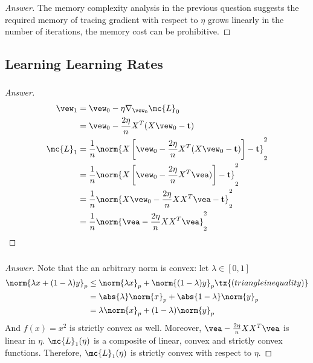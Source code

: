 \documentclass{article}
\begin{document}
	\subsubsection{}
	\begin{proof}[Answer]
		The memory complexity analysis in the previous question suggests the required memory of tracing gradient with respect to $\eta$ grows linearly in the number of iterations, the memory cost can be prohibitive.
	\end{proof}

	\subsection{Learning Learning Rates}
	\subsubsection{}
	\begin{proof}[Answer]
		\begin{align}
			\vew_1
			&= \vew_0 - \eta \nabla_{\vew_0} \mc{L}_0 \\
			&= \vew_0 - \frac{2 \eta}{n} X^T (X \vew_0 - \textbf{t}) \\
			\mc{L}_1
			&= \frac{1}{n} \norm{
				X \left [\vew_0 - \frac{2 \eta}{n} X^T (X \vew_0 - \textbf{t}) \right] - \textbf{t}
			}^2_2 \\
			&= \frac{1}{n} \norm{
				X \left [\vew_0 - \frac{2 \eta}{n} X^T \vea) \right] - \textbf{t}
			}^2_2 \\
			&= \frac{1}{n} \norm{
				X \vew_0 - \frac{2 \eta}{n} X X^T \vea - \textbf{t}
			}^2_2 \\
			&= \frac{1}{n} \norm{
				\vea - \frac{2 \eta}{n} X X^T \vea
			}^2_2
		\end{align}
	\end{proof}

	\subsubsection{}
	\begin{proof}[Answer]
		Note that the an arbitrary norm is convex: let $\lambda \in [0, 1]$
		\begin{align}
			\norm{\lambda x + (1 - \lambda) y}_p
			&\leq \norm{\lambda x}_p + \norm{(1 - \lambda) y}_p \tx{ (triangle inequality)} \\
			&= \abs{\lambda} \norm{x}_p + \abs{1 - \lambda} \norm{y}_p \\
			&= \lambda \norm{x}_p + (1 - \lambda) \norm{y}_p
		\end{align}
		And $f(x) = x^2$ is strictly convex as well.
		Moreover, $\vea - \frac{2 \eta}{n} X X^T \vea$ is linear in $\eta$. 
		$\mc{L}_1(\eta)$ is a composite of linear, convex and strictly convex functions. Therefore, $\mc{L}_1(\eta)$ is strictly convex with respect to $\eta$.
	\end{proof}
\end{document}
